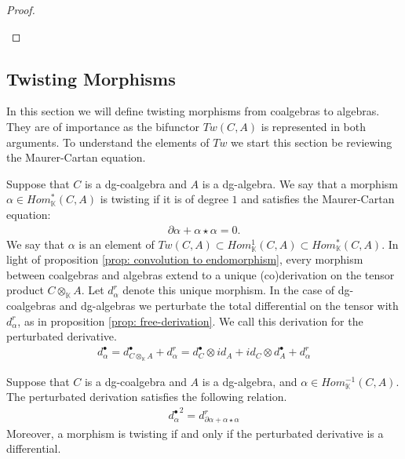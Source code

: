 \documentclass[../thesis.tex]{subfiles}
\begin{document}
\begin{proof}
\begin{center}
                \end{center}

            \end{proof}

    \subsection{Twisting Morphisms}

            In this section we will define twisting morphisms from coalgebras to algebras. They are of importance as the bifunctor $Tw(C,A)$ is represented in both arguments. To understand the elements of $Tw$ we start this section be reviewing the Maurer-Cartan equation.

            Suppose that $C$ is a dg-coalgebra and $A$ is a dg-algebra. We say that a morphism $\alpha\in Hom_\mathbb{K}^*(C,A)$ is twisting if it is of degree $1$ and satisfies the Maurer-Cartan equation:
            \begin{align*}
                \partial\alpha + \alpha\star\alpha = 0\text{.}
            \end{align*}
            We say that $\alpha$ is an element of $Tw(C,A)\subset Hom_\mathbb{K}^{1}(C,A)\subset Hom_\mathbb{K}^*(C,A)$. In light of proposition \ref{prop: convolution to endomorphism}, every morphism between coalgebras and algebras extend to a unique (co)derivation on the tensor product $C\otimes_\mathbb{K}A$. Let $d_\alpha^r$ denote this unique morphism. In the case of dg-coalgebras and dg-algebras we perturbate the total differential on the tensor with $d_\alpha^r$, as in proposition \ref{prop: free-derivation}. We call this derivation for the perturbated derivative.
            \begin{align*}
                d_\alpha^\bullet = d_{C\otimes_\mathbb{K}A}^\bullet + d_\alpha^r = d_C^\bullet\otimes id_A + id_C\otimes d_A^\bullet + d_\alpha^r
            \end{align*}
            \begin{proposition}\label{prop: twisted-differential}
                Suppose that $C$ is a dg-coalgebra and $A$ is a dg-algebra, and $\alpha\in Hom_\mathbb{K}^{-1}(C,A)$. The perturbated derivation satisfies the following relation.
                \begin{align*}
                    {d^\bullet_\alpha}^2 = d^r_{\partial \alpha + \alpha\star\alpha}
                \end{align*}
                Moreover, a morphism is twisting if and only if the perturbated derivative is a differential.
            \end{proposition}
\end{document}
